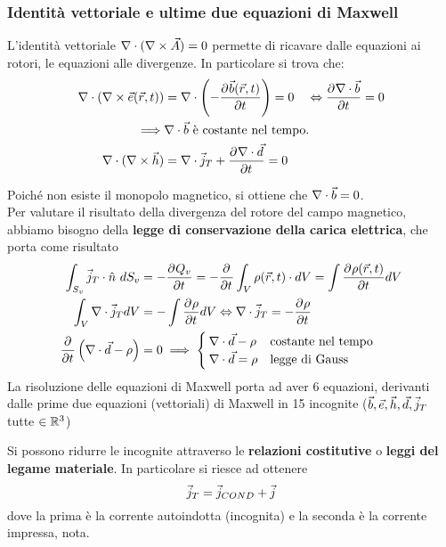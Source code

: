 \subsubsection{Identità vettoriale e ultime due equazioni di Maxwell}
L'identità vettoriale $\nabla\cdot (\nabla\times \vec{A}) = 0$ permette di ricavare
dalle equazioni ai rotori, le equazioni alle divergenze. In particolare si trova che:
\begin{equation}\begin{split}
  \nabla\cdot (\nabla\times \vec{e}(\vec{r},t)) &= \nabla\cdot \left(-\frac{\partial^{} {\vec{b}(\vec{r},t)}}{\partial {t}^{}}\right)=0 \quad \Leftrightarrow \frac{\partial^{} {\nabla\cdot \vec{b}}}{\partial {t}^{}}=0\\
  \implies & \nabla\cdot \vec{b} \text{ è costante nel tempo.}\\
  \nabla\cdot(\nabla\times \vec{h}) &= \nabla\cdot \vec{j}_T + \frac{\partial^{} {\nabla\cdot \vec{d}}}{\partial {t}^{}}=0
\end{split}\end{equation}

Poiché non esiste il monopolo magnetico, si ottiene che $\nabla\cdot\vec{b} =0$.\\
Per valutare il risultato della divergenza del rotore del campo magnetico, abbiamo bisogno della \textbf{legge di conservazione della carica elettrica}, che porta come risultato
\begin{equation}\begin{split}
  \int_{S_v}\vec{j}_T \cdot \hat{n} ~ dS_v &= -\frac{\partial^{} {Q_v}}{\partial {t}^{}} = -\frac{\partial^{} {}}{\partial {t}^{}} \int_V \rho(\vec{r},t) \cdot dV = \int \frac{\partial^{} {\rho(\vec{r},t)}}{\partial {t}^{}} dV\\
  \int_V \nabla\cdot \vec{j}_T dV &= - \int \frac{\partial^{} {\rho}}{\partial {t}^{}} dV \Leftrightarrow \nabla\cdot \vec{j}_T = -\frac{\partial^{} {\rho}}{\partial {t}^{}} \\
  \frac{\partial^{} {}}{\partial {t}^{}} \left(\nabla\cdot \vec{d} - \rho \right) &=0 \implies
  \begin{cases}
    \nabla\cdot \vec{d} - \rho & \text{costante nel tempo} \\
    \nabla\cdot \vec{d} = \rho & \text{legge di Gauss}
  \end{cases}
\end{split}\end{equation}
La risoluzione delle equazioni di Maxwell porta ad aver 6 equazioni, derivanti
dalle prime due equazioni (vettoriali) di Maxwell in 15 incognite ($\vec{b} , \vec{e} , \vec{h} , \vec{d} , \vec{j}_T $ tutte $\in \mathbb{R}^3$)

Si possono ridurre le incognite attraverso le \textbf{relazioni costitutive} o
\textbf{leggi del legame materiale}. In particolare si riesce ad ottenere
\begin{equation}
  \vec{j}_T = \vec{j}_{COND} + \vec{j}
\end{equation}
dove la prima è la corrente autoindotta (incognita) e la seconda è la corrente impressa, nota.

